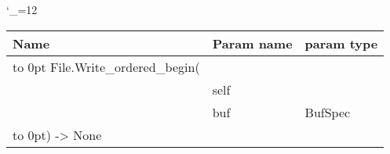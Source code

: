 \begingroup \catcode`\_=12 \tt
\begin{tabular}{lll}
\toprule
\textrm{Name}&\textrm{Param name}&\textrm{param type}\\
\midrule
\hbox to 0pt {File.Write_ordered_begin(\hss}\\
& self\\
& buf & BufSpec\\
\hbox to 0pt{) -> None\hss}\\
\bottomrule
\end{tabular}
\endgroup
